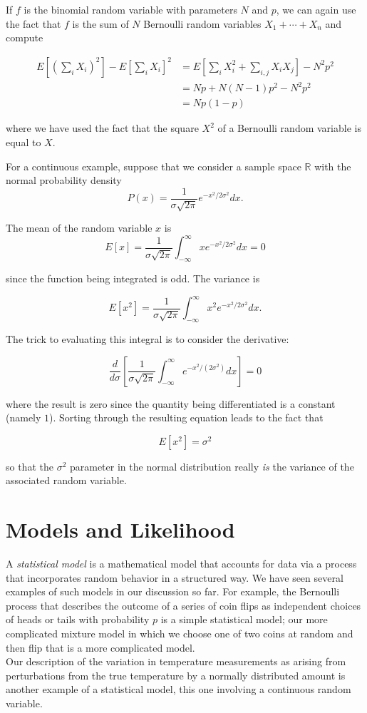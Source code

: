 \documentclass[
  11pt,
  letterpaper,
]{scrbook}
\theoremstyle{plain}
\theoremstyle{plain}
\theoremstyle{remark}
\begin{document}
If \(f\) is the binomial random variable with parameters \(N\) and
\(p\), we can again use the fact that \(f\) is the sum of \(N\)
Bernoulli random variables \(X_1+\cdots+X_n\) and compute

\begin{align*}
E[(\sum_{i}X_i)^2]-E[\sum_{i} X_{i}]^2 &=E[\sum_{i} X_i^2+\sum_{i,j}X_{i}X_{j}]-N^2p^2\\
&=Np+N(N-1)p^2-N^2p^2 \\
&=Np(1-p)
\end{align*}

where we have used the fact that the square \(X^2\) of a Bernoulli
random variable is equal to \(X\).

For a continuous example, suppose that we consider a sample space
\(\mathbb{R}\) with the normal probability density \[
P(x) = \frac{1}{\sigma\sqrt{2\pi}}e^{-x^2/2\sigma^2}dx.
\]

The mean of the random variable \(x\) is \[
E[x] =\frac{1}{\sigma\sqrt{2\pi}}\int_{-\infty}^{\infty} xe^{-x^2/2\sigma^2}dx=0
\]

since the function being integrated is odd. The variance is

\[
E[x^2] = \frac{1}{\sigma\sqrt{2\pi}}\int_{-\infty}^{\infty} x^2e^{-x^2/2\sigma^2}dx.
\]

The trick to evaluating this integral is to consider the derivative:

\[
\frac{d}{d\sigma}\left[\frac{1}{\sigma\sqrt{2\pi}}\int_{-\infty}^{\infty}e^{-x^2/(2\sigma^2)}dx\right]=0
\]

where the result is zero since the quantity being differentiated is a
constant (namely \(1\)). Sorting through the resulting equation leads to
the fact that

\[
E[x^2]=\sigma^2
\]

so that the \(\sigma^2\) parameter in the normal distribution really
\emph{is} the variance of the associated random variable.

\hypertarget{models-and-likelihood}{%
\section{Models and Likelihood}\label{models-and-likelihood}}

A \emph{statistical model} is a mathematical model that accounts for
data via a process that incorporates random behavior in a structured
way. We have seen several examples of such models in our discussion so
far. For example, the Bernoulli process that describes the outcome of a
series of coin flips as independent choices of heads or tails with
probability \(p\) is a simple statistical model; our more complicated
mixture model in which we choose one of two coins at random and then
flip that is a more complicated model.\\
Our description of the variation in temperature measurements as arising
from perturbations from the true temperature by a normally distributed
amount is another example of a statistical model, this one involving a
continuous random variable.
\end{document}
